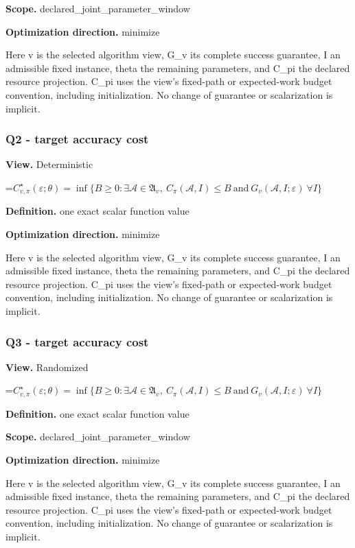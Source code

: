 \documentclass[10pt,a4paper]{article}
\newcommand{\AtlasMath}[1]{\par\begingroup\centering\setbox0=\hbox{$\displaystyle #1$}\ifdim\wd0>1.4\linewidth\typeout{ATLAS WIDE FORMULA: \the\wd0}\fi\ifdim\wd0>\linewidth\resizebox{\linewidth}{!}{\box0}\else\box0\fi\par\endgroup}
\begin{document}
\textbf{Scope.} declared\_joint\_parameter\_window

\textbf{Optimization direction.} minimize

Here v is the selected algorithm view, G\_v its complete success guarantee, I an admissible fixed instance, theta the remaining parameters, and C\_pi the declared resource projection. C\_pi uses the view's fixed-path or expected-work budget convention, including initialization. No change of guarantee or scalarization is implicit.

\subsubsection{Q2 - target accuracy cost}
\textbf{View.} Deterministic

\AtlasMath{C^\star_{v,\pi}(\varepsilon;\theta)=\inf\{B\ge0:\exists\mathcal A\in\mathfrak A_v,\ C_\pi(\mathcal A,I)\le B\ \text{and}\ G_v(\mathcal A,I;\varepsilon)\ \forall I\}}
\textbf{Definition.} one exact scalar function value

\textbf{Optimization direction.} minimize

Here v is the selected algorithm view, G\_v its complete success guarantee, I an admissible fixed instance, theta the remaining parameters, and C\_pi the declared resource projection. C\_pi uses the view's fixed-path or expected-work budget convention, including initialization. No change of guarantee or scalarization is implicit.

\subsubsection{Q3 - target accuracy cost}
\textbf{View.} Randomized

\AtlasMath{C^\star_{v,\pi}(\varepsilon;\theta)=\inf\{B\ge0:\exists\mathcal A\in\mathfrak A_v,\ C_\pi(\mathcal A,I)\le B\ \text{and}\ G_v(\mathcal A,I;\varepsilon)\ \forall I\}}
\textbf{Definition.} one exact scalar function value

\textbf{Scope.} declared\_joint\_parameter\_window

\textbf{Optimization direction.} minimize

Here v is the selected algorithm view, G\_v its complete success guarantee, I an admissible fixed instance, theta the remaining parameters, and C\_pi the declared resource projection. C\_pi uses the view's fixed-path or expected-work budget convention, including initialization. No change of guarantee or scalarization is implicit.
\end{document}
